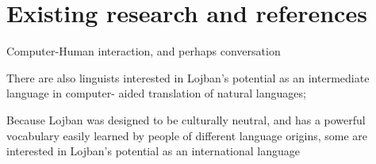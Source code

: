 \chapter{Existing research and references}

Computer-Human interaction, and perhaps conversation

There are also linguists interested in Lojban's potential as an intermediate language in computer-
aided translation of natural languages;

Because Lojban was designed to be culturally neutral, and has a
powerful vocabulary easily learned by people of different language origins, some are interested in
Lojban’s potential as an international language

\cite{nicholas2003lojban}

\newpage \thispagestyle{empty} \ \newpage